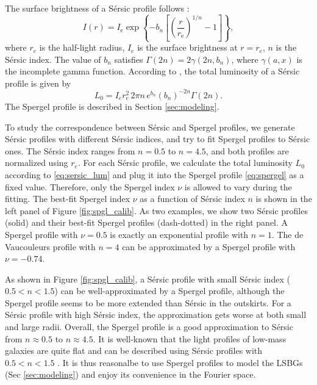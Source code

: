 \documentclass[twocolumn,astrosymb,twocolappendix]{aastex631}
\newcommand{\sersic}{S\'ersic}
\begin{document}
\begin{CJK*}{UTF8}{gbsn}
The surface brightness of a \sersic{} profile follows \citep{Sersic1963,Graham2005}:
\begin{equation}\label{eq:sersic}
    I(r)=I_{\mathrm{e}} \exp \left\{-b_{n}\left[\left(\frac{r}{r_{\mathrm{e}}}\right)^{1 / n}-1\right]\right\},
\end{equation}
where $r_e$ is the half-light radius, $I_e$ is the surface brightness at $r=r_e$, $n$ is the \sersic{} index. The value of $b_n$ satisfies $\Gamma(2 n)=2 \gamma\left(2 n, b_{n}\right)$, where $\gamma(a, x)$ is the incomplete gamma function. According to \citet{Graham2005}, the total luminosity of a \sersic{} profile is given by 
\begin{equation}\label{eq:sersic_lum}
    L_0 = I_{e} r_{e}^{2}\, 2 \pi n\, e^{b_{n}} \left(b_{n}\right)^{-2 n} \Gamma(2 n).
\end{equation}
The Spergel profile is described in Section \ref{sec:modeling}. 

To study the correspondence between \sersic{} and Spergel profiles, we generate \sersic{} profiles with different \sersic{} indices, and try to fit Spergel profiles to \sersic{} ones. The \sersic{} index ranges from $n=0.5$ to $n=4.5$, and both profiles are normalized using $r_e$. For each \sersic{} profile, we calculate the total luminosity $L_0$ according to \eqref{eq:sersic_lum} and plug it into the Spergel profile \eqref{eq:spergel} as a fixed value. Therefore, only the Spergel index $\nu$ is allowed to vary during the fitting. The best-fit Spergel index $\nu$ as a function of \sersic{} index $n$ is shown in the left panel of Figure \ref{fig:spgl_calib}. As two examples, we show two \sersic{} profiles (solid) and their best-fit Spergel profiles (dash-dotted) in the right panel. A Spergel profile with $\nu=0.5$ is exactly an exponential profile with $n=1$. The de Vaucouleurs profile \citep{deVaucouleurs1948} with $n=4$ can be approximated by a Spergel profile with $\nu=-0.74$. 

As shown in Figure \ref{fig:spgl_calib}, a \sersic{} profile with small \sersic{} index ($0.5 < n < 1.5$) can be well-approximated by a Spergel profile, although the Spergel profile seems to be more extended than \sersic{} in the outskirts. For a \sersic{} profile with high \sersic{} index, the approximation gets worse at both small and large radii. Overall, the Spergel profile is a good approximation to \sersic{} from $n\approx 0.5$ to $n\approx 4.5$. It is well-known that the light profiles of low-mass galaxies are quite flat and can be described using \sersic{} profiles with $0.5 < n < 1.5$ \citep[e.g.,][]{Lange2015,Greco2018,ELVES-I}. It is thus reasonalbe to use Spergel profiles to model the LSBGs (Sec \ref{sec:modeling}) and enjoy its convenience in the Fourier space. 




\end{CJK*}
\end{document}
